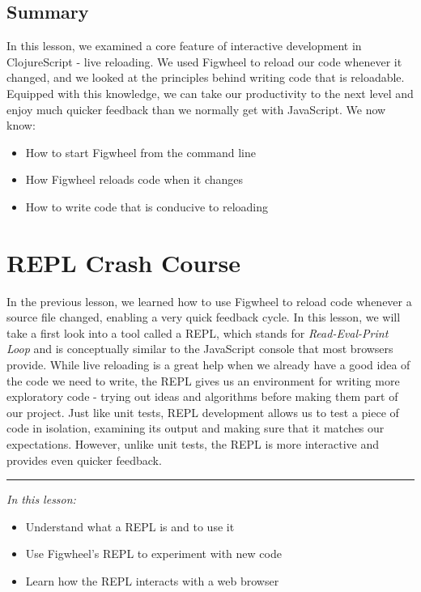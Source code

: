 \documentclass[10pt,twoside,openright]{memoir}
\begin{document}
\section{Summary}

In this lesson, we examined a core feature of interactive development in
ClojureScript - live reloading. We used Figwheel to reload our code
whenever it changed, and we looked at the principles behind writing code
that is reloadable. Equipped with this knowledge, we can take our
productivity to the next level and enjoy much quicker feedback than we
normally get with JavaScript. We now know:

\begin{itemize}
\tightlist
\item
  How to start Figwheel from the command line
\item
  How Figwheel reloads code when it changes
\item
  How to write code that is conducive to reloading
\end{itemize}


\chapter{REPL Crash Course}

In the previous lesson, we learned how to use Figwheel to reload code
whenever a source file changed, enabling a very quick feedback cycle. In
this lesson, we will take a first look into a tool called a REPL, which
stands for \emph{Read-Eval-Print Loop} and is conceptually similar to
the JavaScript console that most browsers provide. While live reloading
is a great help when we already have a good idea of the code we need to
write, the REPL gives us an environment for writing more exploratory
code - trying out ideas and algorithms before making them part of our
project. Just like unit tests, REPL development allows us to test a
piece of code in isolation, examining its output and making sure that it
matches our expectations. However, unlike unit tests, the REPL is more
interactive and provides even quicker feedback.

\begin{center}\rule{0.5\linewidth}{0.5pt}\end{center}

\emph{In this lesson:}

\begin{itemize}
\tightlist
\item
  Understand what a REPL is and to use it
\item
  Use Figwheel's REPL to experiment with new code
\item
  Learn how the REPL interacts with a web browser
\end{itemize}
\end{document}
